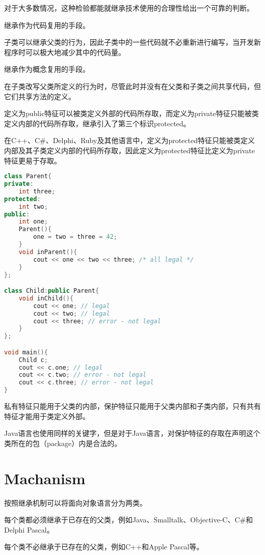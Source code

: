 对于大多数情况，这种检验都能就继承技术使用的合理性给出一个可靠的判断。

\begin{compactitem}
\item 继承作为代码复用的手段。

子类可以继承父类的行为，因此子类中的一些代码就不必重新进行编写，当开发新程序时可以极大地减少其中的代码量。

\item 继承作为概念复用的手段。

在子类改写父类所定义的行为时，尽管此时并没有在父类和子类之间共享代码，但它们共享方法的定义。
\end{compactitem}

定义为public特征可以被类定义外部的代码所存取，而定义为private特征只能被类定义内部的代码所存取，继承引入了第三个标识protected。

在C++、C\#、Delphi、Ruby及其他语言中，定义为protected特征只能被类定义内部及其子类定义内部的代码所存取，因此定义为protected特征比定义为private特征更易于存取。



\begin{lstlisting}[language=C++]
class Parent{
private:
	int three;
protected:
	int two;
public:
	int one;
	Parent(){
		one = two = three = 42;
	}
	void inParent(){
		cout << one << two << three; /* all legal */ 
	}
};

class Child:public Parent{
	void inChild(){
		cout << one; // legal
		cout << two; // legal
		cout << three; // error - not legal
	}
};

void main(){
	Child c;
	cout << c.one; // legal
	cout << c.two; // error - not legal
	cout << c.three; // error - not legal
}
\end{lstlisting}

私有特征只能用于父类的内部，保护特征只能用于父类内部和子类内部，只有共有特征才能用于类定义外部。

Java语言也使用同样的关键字，但是对于Java语言，对保护特征的存取在声明这个类所在的包（package）内是合法的。


\section{Machanism}

按照继承机制可以将面向对象语言分为两类。

\begin{compactitem}
\item 每个类都必须继承于已存在的父类，例如Java、Smalltalk、Objective-C、C\#和Delphi Pascal。
\item 每个类不必继承于已存在的父类，例如C++和Apple Pascal等。
\end{compactitem}

